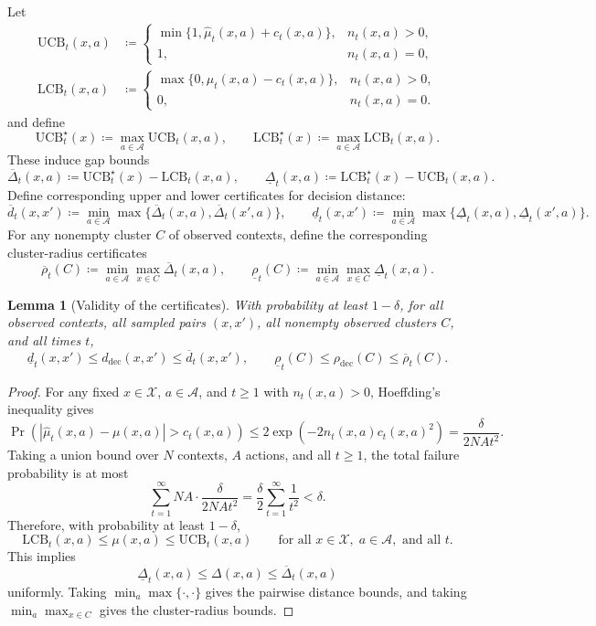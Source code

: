 \documentclass{article}
\theoremstyle{plain}
\newtheorem{lemma}{Lemma}
\theoremstyle{definition}
\theoremstyle{remark}
\newcommand{\cA}{\mathcal{A}}
\newcommand{\cX}{\mathcal{X}}
\newcommand{\UCB}{\mathrm{UCB}}
\newcommand{\LCB}{\mathrm{LCB}}
\begin{document}
Let
\[
\begin{aligned}
\UCB_t(x,a)
&\coloneqq
\begin{cases}
\min\{1,\hat\mu_t(x,a)+c_t(x,a)\}, & n_t(x,a)>0,\\
1, & n_t(x,a)=0,
\end{cases}\\[0.5em]
\LCB_t(x,a)
&\coloneqq
\begin{cases}
\max\{0,\hat\mu_t(x,a)-c_t(x,a)\}, & n_t(x,a)>0,\\
0, & n_t(x,a)=0.
\end{cases}
\end{aligned}
\]
and define
\[
\UCB_t^\star(x)\coloneqq \max_{a\in\cA}\UCB_t(x,a),
\qquad
\LCB_t^\star(x)\coloneqq \max_{a\in\cA}\LCB_t(x,a).
\]
These induce gap bounds
\[
\overline\Delta_t(x,a)\coloneqq \UCB_t^\star(x)-\LCB_t(x,a),
\qquad
\underline\Delta_t(x,a)\coloneqq \LCB_t^\star(x)-\UCB_t(x,a).
\]
Define corresponding upper and lower certificates for decision distance:
\begin{equation}
\label{eq:ddec-bounds}
\overline d_t(x,x')
\coloneqq
\min_{a\in\cA}\max\{\overline\Delta_t(x,a),\overline\Delta_t(x',a)\},
\qquad
\underline d_t(x,x')
\coloneqq
\min_{a\in\cA}\max\{\underline\Delta_t(x,a),\underline\Delta_t(x',a)\}.
\end{equation}
For any nonempty cluster \(C\) of observed contexts, define the
corresponding cluster-radius certificates
\begin{equation}
\label{eq:cluster-radius-bounds}
\overline\rho_t(C)
\coloneqq
\min_{a\in\cA}\max_{x\in C}\overline\Delta_t(x,a),
\qquad
\underline\rho_t(C)
\coloneqq
\min_{a\in\cA}\max_{x\in C}\underline\Delta_t(x,a).
\end{equation}

\begin{lemma}[Validity of the certificates]
\label{lem:cert}
With probability at least \(1-\delta\), for all observed contexts, all
sampled pairs \((x,x')\), all nonempty observed clusters \(C\), and all
times \(t\),
\[
\underline d_t(x,x') \le d_{\mathrm{dec}}(x,x') \le \overline d_t(x,x'),
\qquad
\underline\rho_t(C) \le \rho_{\mathrm{dec}}(C) \le \overline\rho_t(C).
\]
\end{lemma}

\begin{proof}
For any fixed \(x\in\cX\), \(a\in\cA\), and \(t\ge1\) with
\(n_t(x,a)>0\), Hoeffding's inequality gives
\[
\Pr\!\left(
|\hat\mu_t(x,a)-\mu(x,a)|>c_t(x,a)
\right)
\le
2\exp\!\left(-2n_t(x,a)c_t(x,a)^2\right)
=
\frac{\delta}{2NAt^2}.
\]
Taking a union bound over \(N\) contexts, \(A\) actions, and all
\(t\ge1\), the total failure probability is at most
\[
\sum_{t=1}^{\infty} NA\cdot \frac{\delta}{2NAt^2}
=
\frac{\delta}{2}\sum_{t=1}^{\infty}\frac{1}{t^2}
<\delta.
\]
Therefore, with probability at least \(1-\delta\),
\[
\LCB_t(x,a)\le \mu(x,a)\le \UCB_t(x,a)
\qquad
\text{for all }x\in\cX,\;a\in\cA,\text{ and all }t.
\]
This implies
\[
\underline\Delta_t(x,a)\le \Delta(x,a)\le \overline\Delta_t(x,a)
\]
uniformly. Taking \(\min_a\max\{\cdot,\cdot\}\) gives the pairwise
distance bounds, and taking \(\min_a\max_{x\in C}\) gives the
cluster-radius bounds.
\end{proof}
\end{document}
